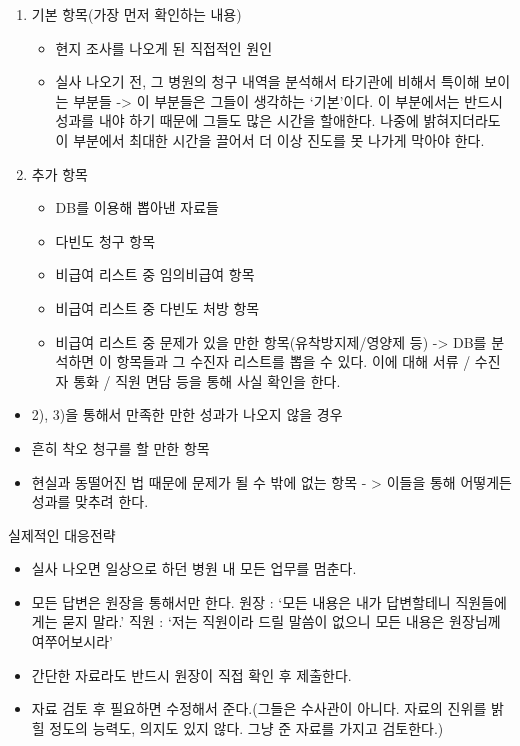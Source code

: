 \begin{enumerate}[①]\tightlist
\item 기본 항목(가장 먼저 확인하는 내용)
	\begin{itemize}\tightlist
	\item 현지 조사를 나오게 된 직접적인 원인 
	\item 실사 나오기 전, 그 병원의 청구 내역을 분석해서 타기관에 비해서 특이해 보이는 부분들 \newline
-> 이 부분들은 그들이 생각하는 ‘기본’이다. 이 부분에서는 반드시 성과를 내야 하기 때문에 그들도 많은 시간을 할애한다. 나중에 밝혀지더라도 이 부분에서 최대한 시간을 끌어서 더 이상 진도를 못 나가게 막아야 한다.
	\end{itemize}
\item 추가 항목
	\begin{itemize}\tightlist
	\item DB를 이용해 뽑아낸 자료들
	\item 다빈도 청구 항목 
	\item 비급여 리스트 중 임의비급여 항목
	\item 비급여 리스트 중 다빈도 처방 항목
	\item 비급여 리스트 중 문제가 있을 만한 항목(유착방지제/영양제 등) \newline
-> DB를 분석하면 이 항목들과 그 수진자 리스트를 뽑을 수 있다. 이에 대해 서류 / 수진자 통화 / 직원 면담 등을 통해 사실 확인을 한다.
	\end{itemize}
\end{enumerate} 

\begin{itemize}\tightlist
\item 2), 3)을 통해서 만족한 만한 성과가 나오지 않을 경우
\item 흔히 착오 청구를 할 만한 항목
\item 현실과 동떨어진 법 때문에 문제가 될 수 밖에 없는 항목 \newline
 - > 이들을 통해 어떻게든 성과를 맞추려 한다. 
\end{itemize}

\Large{실제적인 대응전략}\normalsize
\par
\medskip 
{}
\begin{itemize}\tightlist
\item 실사 나오면 일상으로 하던 병원 내 모든 업무를 멈춘다.
\item 모든 답변은 원장을 통해서만 한다.\newline
 원장 : ‘모든 내용은 내가 답변할테니 직원들에게는 묻지 말라.’ \newline
 직원 :  ‘저는 직원이라 드릴 말씀이 없으니 모든 내용은 원장님께 여쭈어보시라’
\item 간단한 자료라도 반드시 원장이 직접 확인 후 제출한다.
\item 자료 검토 후 필요하면 수정해서 준다.(그들은 수사관이 아니다. 자료의 진위를 밝힐 정도의 능력도, 의지도 있지 않다. 그냥 준 자료를 가지고 검토한다.)
\end{itemize}

